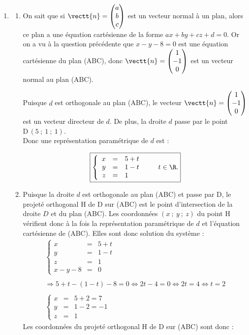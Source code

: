 \begin{enumerate}
\item
	\begin{enumerate}
		\item On sait que si $\vectt{n} = \begin{pmatrix}a\\b\\c\end{pmatrix}$ est un vecteur normal à un plan, alors ce plan a une équation cartésienne de la forme $ax + by + cz + d = 0$. Or on a vu à la question précédente que $x - y - 8 = 0$ est une équation cartésienne du plan (ABC), donc $\vectt{n} = \begin{pmatrix}1\\-1\\0\end{pmatrix}$ est un vecteur normal au plan (ABC).

Puisque $d$ est orthogonale au plan (ABC), le vecteur $\vectt{n} = \begin{pmatrix}1\\-1\\0\end{pmatrix}$ est un vecteur directeur de $d$. De plus, la droite $d$ passe par le point $\mathrm{D}\,(5~;~1~;~1)$. \\
Donc une représentation paramétrique de $d$ est :

\[\boxed{\left\{
\begin{array}{rcl}
x &=& 5 + t\\
y &=& 1 - t\\
z &=& 1
\end{array}\right. \qquad t \in \R.}\]

		\item Puisque la droite $d$ est orthogonale au plan (ABC) et passe par D, le projeté orthogonal H de D sur (ABC) est le point d'intersection de la droite $D$ et du plan (ABC). Les coordonnées $(x~;~y~;~z)$ du point H vérifient donc à la fois la représentation paramétrique de $d$ et l'équation cartésienne de (ABC). Elles sont donc solution du système :
		\[\begin{array}{l}
\left\{
\begin{array}{rcl}
x &=& 5 + t\\
y &=& 1 - t\\
z &=& 1\\
x - y - 8 &=& 0
\end{array}\right.\\
\\
\Longrightarrow 5 + t - (1 - t) - 8 = 0 \iff 2t - 4 = 0 \iff 2t = 4 \iff t = 2\\
\\
\left\{
\begin{array}{rcl}
x &=& 5 + 2 = 7\\
y &=& 1 - 2 = -1\\
z &=& 1
\end{array}\right.\end{array}\]
Les coordonnées du projeté orthogonal H de D sur (ABC) sont donc :


\end{enumerate}
\end{enumerate}
